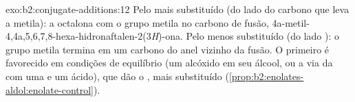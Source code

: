 \begin{solution}{exo:b2:conjugate-additions:12}
Pelo  mais substituído (do lado do carbono que leva a metila): a octalona com o grupo metila
no carbono de fusão, 4a-metil-4,4a,5,6,7,8-hexa-hidronaftalen-2(3\textit{H})-ona. Pelo  menos
substituído (do lado ): o grupo metila termina em um carbono do anel vizinho da fusão. O
primeiro é favorecido em condições de equilíbrio (um alcóxido em seu álcool, ou a via da  com
uma  e um ácido), que dão o , mais substituído
(\cref{prop:b2:enolates-aldol:enolate-control}).
\end{solution}

